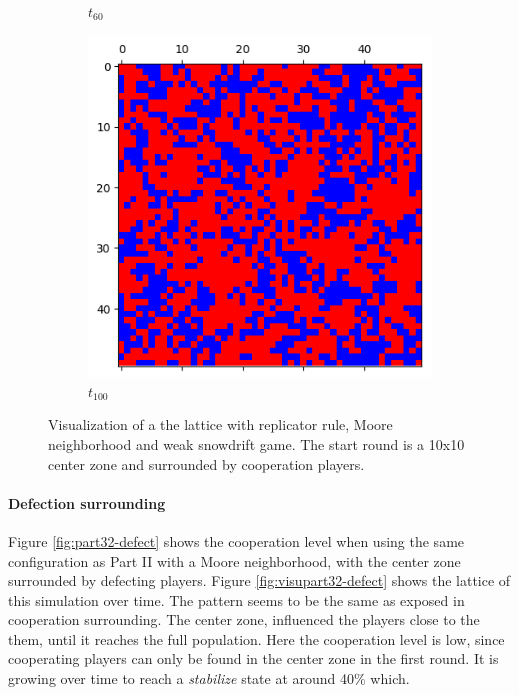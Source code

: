 \documentclass[letterpaper]{article}
\begin{document}
\begin{figure}[H]
\begin{subfigure}{.33\textwidth}
      \caption{$t_{60}$}
    \end{subfigure}
    \begin{subfigure}{.33\textwidth}
      \centering
      \includegraphics[width=1\linewidth]{images/assign2/part32-coop/t100}
      \caption{$t_{100}$}
    \end{subfigure}
    \caption{Visualization of a the lattice with replicator rule,
    Moore neighborhood and weak snowdrift game. The start round is
    a 10x10 center zone and surrounded by cooperation players.}
    \label{fig:visupart32-coop}
\end{figure}


\paragraph{Defection surrounding}

Figure \ref{fig:part32-defect} shows
the cooperation level when using the same configuration as Part II
with a Moore neighborhood, with the center zone surrounded
by defecting players. Figure \ref{fig:visupart32-defect} shows the
lattice of this simulation over time. The pattern seems to be the same
as exposed in cooperation surrounding. The center zone, influenced
the players close to the them, until it reaches the full population.
Here the cooperation level is low, since cooperating players can only be
found in the center zone in the first round.
It is growing over time to reach a \textit{stabilize}
state at around 40\% which.
\end{document}
